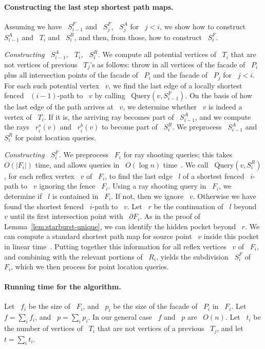 \documentclass[11pt]{article}
\begin{document}
\paragraph{Constructing the last step shortest path maps.}
Assuming we have ~\(S_{i-1}^F\) and ~\(S_j^F\), ~\(S_j^A\) for ~\(j < i\), we show how to construct ~\(S_{i-1}^A\) and ~\(T_i\) and ~\(S_i^R\), and then, from those, how to construct ~\(S_i^F\).

\emph{Constructing ~\(S_{i-1}^A\), ~\(T_i\), ~\(S_i^R\).}
We compute all potential vertices of ~\(T_i\) that are not vertices of previous ~\(T_j\)'s as follows: throw in all vertices of the facade of ~\(P_i\) plus all intersection points of the facade of ~\(P_i\) and the facade of ~\(P_j\) for ~\(j < i\).
For each such potential vertex ~\(v\), we find the last edge of a locally shortest fenced ~\((i-1)\)-path to ~\(v\) by calling ~\(\text{Query}(v, S_{i-1}^F)\).
On the basis of how the last edge of the path arrives at ~\(v\), we determine whether ~\(v\) is indeed a vertex of ~\(T_i\).
If it is, the arriving ray becomes part of ~\(S_{i-1}^A\), and we compute the rays ~\(r_i^s(v)\) and ~\(r_i^b(v)\) to become part of ~\(S_i^R\).
We preprocess ~\(S_{i-1}^A\) and ~\(S_i^R\) for point location queries.

\emph{Constructing ~\(S_i^F\).}
We preprocess ~\(F_i\) for ray shooting queries; this takes ~\(O(|F_i|)\) time, and allows queries in ~\(O(\log n)\) time~\cite{ref17}.
We call ~\(\text{Query}(v, S_i^R)\), for each reflex vertex ~\(v\) of ~\(F_i\), to find the last edge ~\(l\) of a shortest fenced ~\(i\)-path to ~\(v\) ignoring the fence ~\(F_i\).
Using a ray shooting query in ~\(F_i\), we determine if ~\(l\) is contained in ~\(F_i\).
If not, then we ignore ~\(v\).
Otherwise we have found the shortest fenced ~\(i\)-path to ~\(v\).
Let ~\(r\) be the continuation of ~\(l\) beyond ~\(v\) until its first intersection point with ~\(\partial F_i\).
As in the proof of Lemma~\ref{lem:starburst-unique}, we can identify the hidden pocket beyond ~\(r\).
We can compute a standard shortest path map for source point ~\(v\) inside this pocket in linear time~\cite{ref17}.
Putting together this information for all reflex vertices ~\(v\) of ~\(F_i\), and combining with the relevant portions of ~\(R_i\), yields the subdivision ~\(S_i^F\) of ~\(F_i\), which we then process for point location queries.

\paragraph{Running time for the algorithm.}
Let ~\(f_i\) be the size of ~\(F_i\), and ~\(p_i\) be the size of the facade of ~\(P_i\) in ~\(F_i\).
Let ~\(f = \sum_i f_i\), and ~\(p = \sum_i p_i\).
In our general case ~\(f\) and ~\(p\) are ~\(O(n)\).
Let ~\(t_i\) be the number of vertices of ~\(T_i\) that are not vertices of a previous ~\(T_j\), and let ~\(t = \sum_i t_i\).
\end{document}
